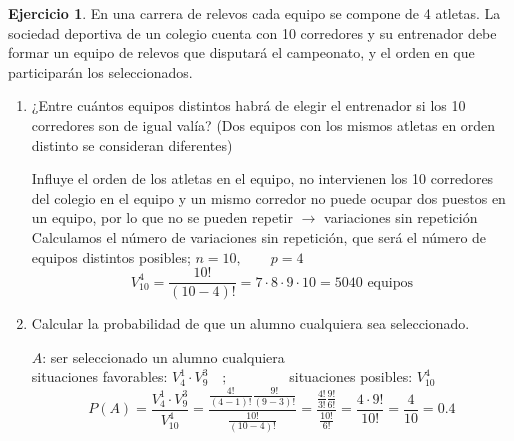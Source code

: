 \documentclass[a4paper, 12pt]{article}
\theoremstyle{definition}
\newtheorem{ej}{Ejercicio}
\begin{document}
\medskip

\begin{ej}
En una carrera de relevos cada equipo se compone de 4 atletas. La sociedad deportiva de un colegio cuenta con 10 corredores y su entrenador debe formar un equipo de relevos que disputará el
campeonato, y el orden en que participarán los seleccionados.
\begin{enumerate}[label=\textit{\alph*)}]
\item ¿Entre cuántos equipos distintos habrá de elegir el entrenador si los 10 corredores son de
igual valía? (Dos equipos con los mismos atletas en orden distinto se consideran diferentes)

\medskip

Influye el orden de los atletas en el equipo, no intervienen los 10 corredores del colegio en el equipo y un mismo corredor no puede ocupar dos puestos en un equipo, por lo que no se pueden repetir $\longrightarrow$ variaciones sin repetición \\
Calculamos el número de variaciones sin repetición, que será el número de equipos distintos posibles; $n = 10,\qquad p = 4$
\[V^4_{10} = \frac{10!}{(10-4)!} = 7\cdot8\cdot9\cdot10 = 5040\text{  equipos}\]
\item Calcular la probabilidad de que un alumno cualquiera sea seleccionado.

\medskip

$A$: ser seleccionado un alumno cualquiera \\
situaciones favorables: $V_4^1 \cdot V_9^3 \quad; \qquad\qquad$ situaciones posibles: $V_{10}^4$
\[P(A) = \frac{V_4^1 \cdot V_9^3}{V_{10}^4} = \frac{\frac{4!}{(4-1)!}\frac{9!}{(9-3)!}}{\frac{10!}{(10-4)!}} = \frac{\frac{4!}{3!}\frac{9!}{6!}}{\frac{10!}{6!}} = \frac{4\cdot 9!}{10!} = \frac{4}{10} = 0.4\]

\end{enumerate}
\end{ej}

\medskip
\end{document}
